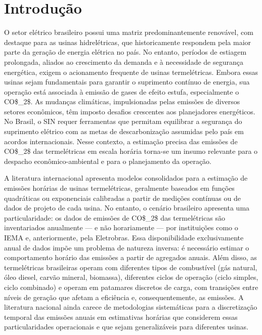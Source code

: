 \chapter{Introdução}\label{chp:intro}

O setor elétrico brasileiro possui uma matriz predominantemente renovável, com destaque para as usinas hidrelétricas, que historicamente respondem pela maior parte da geração de energia elétrica no país. No entanto, períodos de estiagem prolongada, aliados ao crescimento da demanda e à necessidade de segurança energética, exigem o acionamento frequente de usinas termelétricas. Embora essas usinas sejam fundamentais para garantir o suprimento contínuo de energia, sua operação está associada à emissão de gases de efeito estufa, especialmente o \ac{CO$_2$}. As mudanças climáticas, impulsionadas pelas emissões de diversos setores econômicos, têm imposto desafios crescentes aos planejadores energéticos. No Brasil, o \ac{SIN} requer ferramentas que permitam equilibrar a segurança do suprimento elétrico com as metas de descarbonização assumidas pelo país em acordos internacionais. Nesse contexto, a estimação precisa das emissões de \ac{CO$_2$} das termelétricas em escala horária torna-se um insumo relevante para o despacho econômico-ambiental e para o planejamento da operação.

A literatura internacional apresenta modelos consolidados para a estimação de emissões horárias de usinas termelétricas, geralmente baseados em funções quadráticas ou exponenciais calibradas a partir de medições contínuas ou de dados de projeto de cada usina. No entanto, o cenário brasileiro apresenta uma particularidade: os dados de emissões de \ac{CO$_2$} das termelétricas são inventariados anualmente — e não horariamente — por instituições como o \ac{IEMA} e, anteriormente, pela Eletrobras. Essa disponibilidade exclusivamente anual de dados impõe um problema de natureza inversa: é necessário estimar o comportamento horário das emissões a partir de agregados anuais. Além disso, as termelétricas brasileiras operam com diferentes tipos de combustível (gás natural, óleo diesel, carvão mineral, biomassa), diferentes ciclos de operação (ciclo simples, ciclo combinado) e operam em patamares discretos de carga, com transições entre níveis de geração que afetam a eficiência e, consequentemente, as emissões. A literatura nacional ainda carece de metodologias sistemáticas para a discretização temporal das emissões anuais em estimativas horárias que considerem essas particularidades operacionais e que sejam generalizáveis para diferentes usinas.

